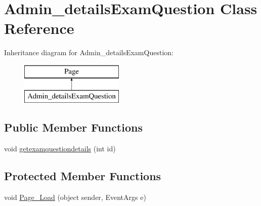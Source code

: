 \hypertarget{class_admin__details_exam_question}{}\section{Admin\+\_\+details\+Exam\+Question Class Reference}
\label{class_admin__details_exam_question}
Inheritance diagram for Admin\+\_\+details\+Exam\+Question\+:\begin{figure}[H]
\begin{center}
\leavevmode
\includegraphics[height=2.000000cm]{class_admin__details_exam_question}
\end{center}
\end{figure}
\subsection*{Public Member Functions}
\begin{DoxyCompactItemize}
\item 
void \mbox{\hyperlink{class_admin__details_exam_question_a8c8c5afd057b8cc83c1dbc4d259ae2ed}{getexamquestiondetails}} (int id)
\end{DoxyCompactItemize}
\subsection*{Protected Member Functions}
\begin{DoxyCompactItemize}
\item 
void \mbox{\hyperlink{class_admin__details_exam_question_abf13ff0bcf6bae3090037e340b5437c9}{Page\+\_\+\+Load}} (object sender, Event\+Args e)
\end{DoxyCompactItemize}
